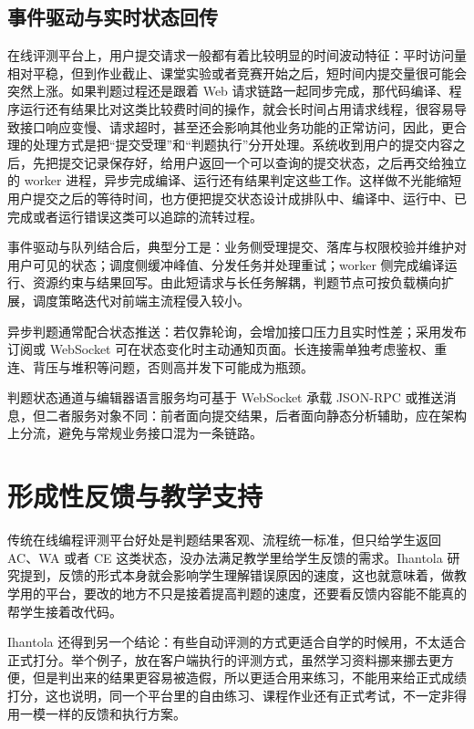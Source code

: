 \subsection{事件驱动与实时状态回传}

在线评测平台上，用户提交请求一般都有着比较明显的时间波动特征：平时访问量相对平稳，但到作业截止、课堂实验或者竞赛开始之后，短时间内提交量很可能会突然上涨。如果判题过程还是跟着 Web 请求链路一起同步完成，那代码编译、程序运行还有结果比对这类比较费时间的操作，就会长时间占用请求线程，很容易导致接口响应变慢、请求超时，甚至还会影响其他业务功能的正常访问，因此，更合理的处理方式是把“提交受理”和“判题执行”分开处理。系统收到用户的提交内容之后，先把提交记录保存好，给用户返回一个可以查询的提交状态，之后再交给独立的 worker 进程，异步完成编译、运行还有结果判定这些工作。这样做不光能缩短用户提交之后的等待时间，也方便把提交状态设计成排队中、编译中、运行中、已完成或者运行错误这类可以追踪的流转过程。

事件驱动与队列结合后，典型分工是：业务侧受理提交、落库与权限校验并维护对用户可见的状态；调度侧缓冲峰值、分发任务并处理重试；worker 侧完成编译运行、资源约束与结果回写。由此短请求与长任务解耦，判题节点可按负载横向扩展，调度策略迭代对前端主流程侵入较小。

异步判题通常配合状态推送：若仅靠轮询，会增加接口压力且实时性差；采用发布订阅或 WebSocket 可在状态变化时主动通知页面\cite{rfc6455websocket}。长连接需单独考虑鉴权、重连、背压与堆积等问题，否则高并发下可能成为瓶颈\cite{owasp2021top10}。

判题状态通道与编辑器语言服务均可基于 WebSocket 承载 JSON-RPC 或推送消息\cite{lsp2024spec,monacolanguageclientrepo}，但二者服务对象不同：前者面向提交结果，后者面向静态分析辅助，应在架构上分流，避免与常规业务接口混为一条链路。

\section{形成性反馈与教学支持}

传统在线编程评测平台好处是判题结果客观、流程统一标准，但只给学生返回 AC、WA 或者 CE 这类状态，没办法满足教学里给学生反馈的需求。Ihantola 研究提到，反馈的形式本身就会影响学生理解错误原因的速度\cite{ihantola2011automated}，这也就意味着，做教学用的平台，要改的地方不只是接着提高判题的速度，还要看反馈内容能不能真的帮学生接着改代码。

Ihantola 还得到另一个结论：有些自动评测的方式更适合自学的时候用，不太适合正式打分。举个例子，放在客户端执行的评测方式，虽然学习资料挪来挪去更方便，但是判出来的结果更容易被造假，所以更适合用来练习，不能用来给正式成绩打分\cite{ihantola2011automated}，这也说明，同一个平台里的自由练习、课程作业还有正式考试，不一定非得用一模一样的反馈和执行方案。

